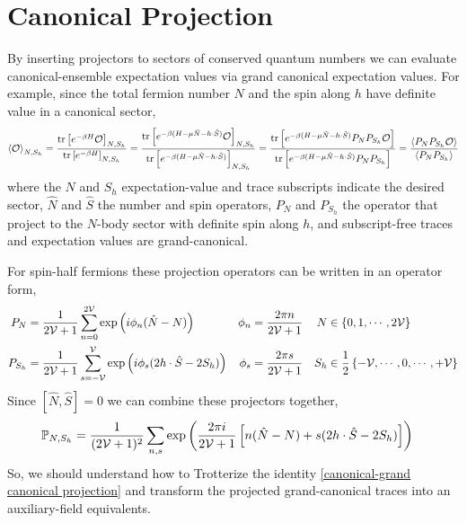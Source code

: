 \section{Canonical Projection}\label{sec:canonical projection}

By inserting projectors to sectors of conserved quantum numbers we can evaluate canonical-ensemble expectation values via grand canonical expectation values.
For example, since the total fermion number $N$ and the spin along $h$ have definite value in a canonical sector,
\begin{align}
	\left\langle \mathcal{O} \right\rangle_{N, S_h}
	=
	\frac{\text{tr}\left[ e^{-\beta H} \mathcal{O}\right]_{N, S_h}}{\text{tr}\left[ e^{-\beta H}\right]_{N, S_h}}
	=
	\frac{\text{tr}\left[ e^{-\beta (H-\mu \hat{N}-h \cdot \hat{S})} \mathcal{O} \right]_{N, S_h}}{\text{tr}\left[ e^{-\beta (H-\mu \hat{N}-h \cdot \hat{S})}\right]_{N, S_h}} 
	=
	\frac{\text{tr}\left[ e^{-\beta (H-\mu\hat{N}-h\cdot \hat{S})} P_N P_{S_h} \mathcal{O}\right]}{\text{tr}\left[ e^{-\beta (H - \mu \hat{N} - h \cdot \hat{S})} P_N P_{S_h}\right]}
	=
	\frac{\left\langle P_N P_{S_h} \mathcal{O} \right\rangle}{\left\langle P_N P_{S_h} \right\rangle}
	\label{eq:canonical-grand canonical projection}
\end{align}
where the $N$ and $S_h$ expectation-value and trace subscripts indicate the desired sector, $\hat{N}$ and $\hat{S}$ the number and spin operators, $P_N$ and $P_{S_h}$ the operator that project to the $N$-body sector with definite spin along $h$, and subscript-free traces and expectation values are grand-canonical.

For spin-half fermions these projection operators can be written in an operator form,
\begin{align}
	P_N &= \frac{1}{2\mathcal{V}+1} \sum_{n=0}^{2\mathcal{V}} \exp\left(i \phi_n (\hat{N}-N)\right)
	&
	\phi_n &= \frac{2\pi n}{2\mathcal{V}+1}
	&
	N &\in \left\{0, 1, \cdots, 2\mathcal{V}\right\}
	\\
	P_{S_h} &= \frac{1}{2\mathcal{V}+1} \sum_{s=-\mathcal{V}}^{\mathcal{V}} \exp\left(i \phi_s (2 h\cdot \hat{S} - 2 S_h )\right)
	&
	\phi_s &= \frac{2\pi s}{2\mathcal{V}+1}
	&
	S_h &\in \frac{1}{2} \left\{ -\mathcal{V}, \cdots, 0, \cdots, +\mathcal{V}\right\}
\end{align}
Since $[\hat{N}, \hat{S}]=0$ we can combine these projectors together,
\begin{align}
	\mathbb{P}_{N, S_h} &= \frac{1}{(2\mathcal{V}+1)^2} \sum_{n,s} \exp\left(\frac{2\pi i}{2\mathcal{V}+1}\left[ n (\hat{N}-N) + s (2h\cdot\hat{S} - 2 S_h)\right]\right)
\end{align}
So, we should understand how to Trotterize the identity \eqref{canonical-grand canonical projection} and transform the projected grand-canonical traces into an auxiliary-field equivalents.

